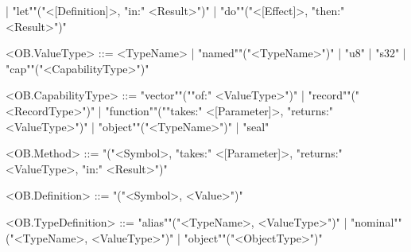\documentclass[main.tex]{subfiles}
\begin{document}
\begin{grammar}
						| "let""("<[Definition]>, "in:" <Result>")"
						| "do""("<[Effect]>, "then:" <Result>")"
				\par
				<OB.ValueType> ::=
								<TypeName> |
						"named""("<TypeName>")"
						| "u8"
						| "s32"
						| "cap""("<CapabilityType>")"
				\par
				<OB.CapabilityType> ::=
						"vector""(""of:" <ValueType>")"
						| "record""("<RecordType>")"
						| "function""(""takes:" <[Parameter]>, "returns:" <ValueType>")"
						| "object""("<TypeName>")"
						| "seal"
				\par
				<OB.Method> ::=
							"("<Symbol>, "takes:" <[Parameter]>, "returns:" <ValueType>, "in:" <Result>")"
				\par
				<OB.Definition> ::=
							"("<Symbol>, <Value>")"
				\par
				<OB.TypeDefinition> ::=
						"alias""("<TypeName>, <ValueType>")"
						| "nominal""("<TypeName>, <ValueType>")"
						| "object""("<ObjectType>")"
				\par
\end{grammar}
\par
\end{document}
